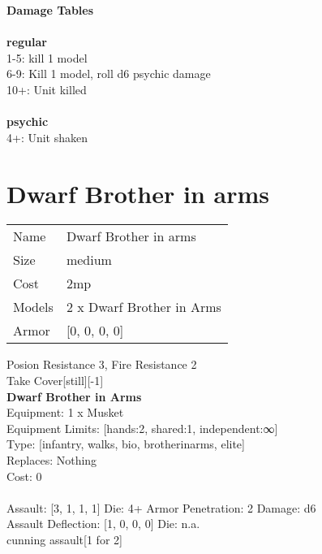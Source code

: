 {\bf Damage Tables} \\
\ \\ {\bf regular } \\
1-5: kill 1 model \\
6-9: Kill 1 model, roll d6 psychic damage \\
10+: Unit killed \\
\ \\ {\bf psychic } \\
4+: Unit shaken \\










\pagebreak\pagebreak

\section{ Dwarf Brother in arms }

\begin{tabular}{ll}
  Name & Dwarf Brother in arms \\
  Size & medium\\
  Cost & 2mp\\
  Models & 2 x Dwarf Brother in Arms\\
  Armor & [0, 0, 0, 0]\\
\end{tabular}

\noindent Posion Resistance 3, Fire Resistance 2\\ 
Take Cover[still][-1]\\ 


{\bf Dwarf Brother in Arms } \\
Equipment: 1 x Musket \\
Equipment Limits: [hands:2, shared:1, independent:∞] \\
Type: [infantry, walks, bio, brotherinarms, elite] \\
Replaces: Nothing \\
Cost: 0\\
\ \\
Assault: [3, 1, 1, 1] Die: 4+ Armor Penetration: 2 Damage: d6 \\
Assault Deflection: [1, 0, 0, 0] Die: n.a.\\
\indent cunning assault[1 for 2]\\ 
 
\ \\

